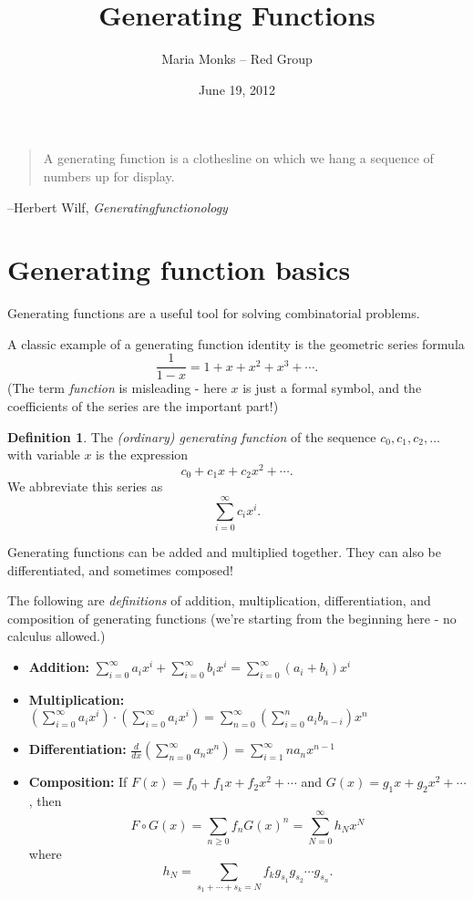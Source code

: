 \documentclass[11pt]{article}
\title{Generating Functions}
\author{Maria Monks -- Red Group}
\date{June 19, 2012}
\theoremstyle{definition}
\newtheorem*{definition}{Definition}
\begin{document}
\maketitle{}

\begin{quote}
  A generating function is a clothesline on which we hang a sequence of numbers up for display.
\end{quote}
\hfill --Herbert Wilf, \textit{Generatingfunctionology}

\section*{Generating function basics}

\indent  Generating functions are a useful tool for solving combinatorial problems.

A classic example of a generating function identity is the geometric series formula $$\frac{1}{1-x}=1+x+x^2+x^3+\cdots.$$  (The term \textit{function} is misleading - here $x$ is just a formal symbol, and the coefficients of the series are the important part!)

\begin{definition}
The \textit{(ordinary) generating function} of the sequence $c_0,c_1,c_2,\ldots$ with variable $x$ is the expression $$c_0+c_1x+c_2x^2+\cdots.$$  We abbreviate this series as $$\sum_{i=0}^\infty c_ix^i.$$
\end{definition}

Generating functions can be added and multiplied together.  They can also be differentiated, and sometimes composed!  

The following are \textit{definitions} of addition, multiplication, differentiation, and composition of generating functions (we're starting from the beginning here - no calculus allowed.)

\begin{itemize}
 \item \textbf{Addition:} $\sum_{i=0}^\infty a_i x^i+\sum_{i=0}^\infty b_i x^i=\sum_{i=0}^\infty (a_i+b_i) x^i$
 \item \textbf{Multiplication:} $\left(\sum_{i=0}^\infty a_i x^i\right)\cdot \left(\sum_{i=0}^\infty a_i x^i\right)=\sum_{n=0}^\infty \left(\sum_{i=0}^n a_ib_{n-i}\right)x^n$
 \item \textbf{Differentiation:} $\frac{d}{dx} \left(\sum_{n=0}^\infty a_n x^n\right)=\sum_{i=1}^\infty na_nx^{n-1}$
 \item \textbf{Composition:} If $F(x)=f_0+f_1x+f_2x^2+\cdots$ and $G(x)=g_1x+g_2x^2+\cdots$, then $$F\circ G(x)=\sum_{n\ge 0} f_nG(x)^n=\sum_{N=0}^\infty h_N x^N$$ where $$h_N=\sum_{s_1+\cdots+s_k=N} f_kg_{s_1}g_{s_2}\cdots g_{s_n}.$$
\end{itemize}
\end{document}
